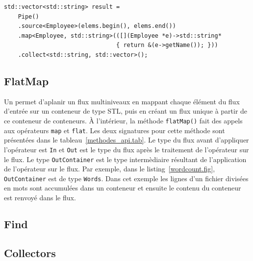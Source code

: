 \begin{Listing}[tbp]
\begin{lstlisting}
std::vector<std::string> result =
	Pipe()
	.source<Employee>(elems.begin(), elems.end())
	.map<Employee, std::string>(([](Employee *e)->std::string* 
        						{ return &(e->getName()); }))
	.collect<std::string, std::vector>();
\end{lstlisting}
\caption{Transformation d'une propri\'et\'e d'un objet \`a l'aide de .}
\label{mapExample.c++}
\end{Listing}


\subsection{FlatMap}

Un   permet d'aplanir un flux multiniveaux en mappant chaque \'el\'ement du flux d'entr\'ee sur un conteneur de type STL, puis en cr\'eant un flux unique \`a partir de ce conteneur de conteneurs. \`A l'int\'erieur, la m\'ethode \texttt{flatMap()} fait des appels aux op\'erateurs \texttt{map} et \texttt{flat}. Les deux signatures pour cette m\'ethode sont pr\'esent\'ees dans le tableau~\ref{methodes_api.tab}. Le type du flux avant d'appliquer l'op\'erateur  est \texttt{In} et \texttt{Out} est le type du flux apr\`es le traitement de l'op\'erateur sur le flux. Le type \texttt{OutContainer} est le type interm\`ediaire r\'esultant de l'application de l'op\'erateur  sur le flux. Par exemple, dans le listing~\ref{wordcount.fig}, \texttt{OutContainer} est de type \texttt{Words}. Dans cet exemple les lignes d'un fichier divis\'ees en mots sont accumul\'ees dans un conteneur et ensuite le contenu du conteneur est renvoy\'e dans le flux.

\subsection{Find}

\subsection{Collectors}
